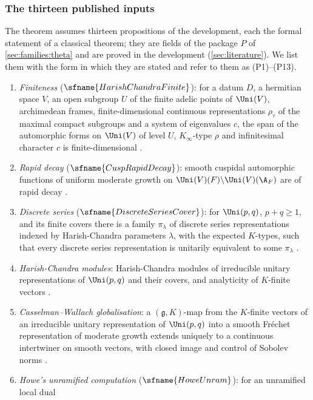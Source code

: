 \subsubsection{The thirteen published inputs}
The theorem assumes thirteen propositions of the development, each the formal statement of a classical theorem;
they are fields of the package $P$ of \cref{sec:families:theta} and are proved in the development
(\cref{sec:literature}). We list them with the form in which they are stated and refer to them as (P1)--(P13).
\begin{enumerate}[label=(P\arabic*),leftmargin=*]
\item\label{pf:open0a:P1} \emph{Finiteness} ($\sfname{HarishChandraFinite}$): for a datum $D$, a hermitian space
$V$, an open subgroup $U$ of the finite adelic points of $\Uni(V)$, archimedean frames, finite-dimensional
continuous representations $\rho_\tau$ of the maximal compact subgroups and a system of eigenvalues $c$, the span of
the automorphic forms on $\Uni(V)$ of level $U$, $K_\infty$-type $\rho$ and infinitesimal character $c$ is
finite-dimensional \cite{HarishChandra1968,Borel1969}.
\item\label{pf:open0a:P2} \emph{Rapid decay} ($\sfname{CuspRapidDecay}$): smooth cuspidal automorphic functions of
uniform moderate growth on $\Uni(V)(F)\backslash\Uni(V)(\A_F)$ are of rapid decay
\cite{HarishChandra1968,MoeglinWaldspurger1995}.
\item\label{pf:open0a:P3} \emph{Discrete series} ($\sfname{DiscreteSeriesCover}$): for $\Uni(p,q)$, $p+q\ge1$, and
its finite covers there is a family $\pi_\lambda$ of discrete series representations indexed by Harish-Chandra
parameters $\lambda$, with the expected $K$-types, such that every discrete series representation is unitarily
equivalent to some $\pi_\lambda$ \cite{HarishChandra1966}.
\item\label{pf:open0a:P4} \emph{Harish-Chandra modules}: Harish-Chandra modules of irreducible unitary
representations of $\Uni(p,q)$ and their covers, and analyticity of $K$-finite vectors \cite{HarishChandra1953}.
\item\label{pf:open0a:P5} \emph{Casselman--Wallach globalisation}: a $(\mathfrak g,K)$-map from the $K$-finite
vectors of an irreducible unitary representation of $\Uni(p,q)$ into a smooth Fr\'echet representation of moderate
growth extends uniquely to a continuous intertwiner on smooth vectors, with closed image and control of Sobolev norms
\cite{Casselman1989,Wallach1992}.
\item\label{pf:open0a:P6} \emph{Howe's unramified computation} ($\sfname{HoweUnram}$): for an unramified local dual

\end{enumerate}
